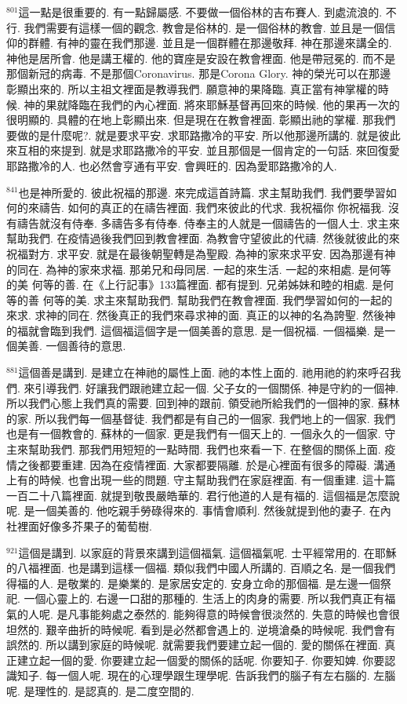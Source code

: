\documentclass{book}
\begin{document}
$^{801}$這一點是很重要的.
有一點歸屬感.
不要做一個俗林的吉布賽人.
到處流浪的.
不行.
我們需要有這樣一個的觀念.
教會是俗林的.
是一個俗林的教會.
並且是一個信仰的群體.
有神的靈在我們那邊.
並且是一個群體在那邊敬拜.
神在那邊來講全的.
神他是居所會.
他是講王權的.
他的寶座是安設在教會裡面.
他是帶冠冕的.
而不是那個新冠的病毒.
不是那個Coronavirus.
那是Corona Glory.
神的榮光可以在那邊彰顯出來的.
所以主祖文裡面是教導我們.
願意神的果降臨.
真正當有神掌權的時候.
神的果就降臨在我們的內心裡面.
將來耶穌基督再回來的時候.
他的果再一次的很明顯的.
具體的在地上彰顯出來.
但是現在在教會裡面.
彰顯出祂的掌權.
那我們要做的是什麼呢?.
就是要求平安.
求耶路撒冷的平安.
所以他那邊所講的.
就是彼此來互相的來提到.
就是求耶路撒冷的平安.
並且那個是一個肯定的一句話.
來回復愛耶路撒冷的人.
也必然會亨通有平安.
會興旺的.
因為愛耶路撒冷的人.

$^{841}$也是神所愛的.
彼此祝福的那邊.
來完成這首詩篇.
求主幫助我們.
我們要學習如何的來禱告.
如何的真正的在禱告裡面.
我們來彼此的代求.
我祝福你 你祝福我.
沒有禱告就沒有侍奉.
多禱告多有侍奉.
侍奉主的人就是一個禱告的一個人士.
求主來幫助我們.
在疫情過後我們回到教會裡面.
為教會守望彼此的代禱.
然後就彼此的來祝福對方.
求平安.
就是在最後朝聖轉是為聖殿.
為神的家來求平安.
因為那邊有神的同在.
為神的家來求福.
那弟兄和母同居.
一起的來生活.
一起的來相處.
是何等的美 何等的善.
在《上行記事》133篇裡面.
都有提到.
兄弟姊妹和睦的相處.
是何等的善 何等的美.
求主來幫助我們.
幫助我們在教會裡面.
我們學習如何的一起的來求.
求神的同在.
然後真正的我們來尋求神的面.
真正的以神的名為誇聖.
然後神的福就會臨到我們.
這個福這個字是一個美善的意思.
是一個祝福.
一個福樂.
是一個美善.
一個善待的意思.

$^{881}$這個善是講到.
是建立在神祂的屬性上面.
祂的本性上面的.
祂用祂的約來呼召我們.
來引導我們.
好讓我們跟祂建立起一個.
父子女的一個關係.
神是守約的一個神.
所以我們心態上我們真的需要.
回到神的跟前.
領受祂所給我們的一個神的家.
蘇林的家.
所以我們每一個基督徒.
我們都是有自己的一個家.
我們地上的一個家.
我們也是有一個教會的.
蘇林的一個家.
更是我們有一個天上的.
一個永久的一個家.
守主來幫助我們.
那我們用短短的一點時間.
我們也來看一下.
在整個的關係上面.
疫情之後都要重建.
因為在疫情裡面.
大家都要隔離.
於是心裡面有很多的障礙.
溝通上有的時候.
也會出現一些的問題.
守主幫助我們在家庭裡面.
有一個重建.
這十篇一百二十八篇裡面.
就提到敬畏嚴皓華的.
君行他道的人是有福的.
這個福是怎麼說呢.
是一個美善的.
他吃親手勞碌得來的.
事情會順利.
然後就提到他的妻子.
在內社裡面好像多芥果子的葡萄樹.

$^{921}$這個是講到.
以家庭的背景來講到這個福氣.
這個福氣呢.
士平經常用的.
在耶穌的八福裡面.
也是講到這樣一個福.
類似我們中國人所講的.
百順之名.
是一個我們得福的人.
是敬業的.
是樂業的.
是家居安定的.
安身立命的那個福.
是左邊一個祭祀.
一個心靈上的.
右邊一口甜的那種的.
生活上的肉身的需要.
所以我們真正有福氣的人呢.
是凡事能夠處之泰然的.
能夠得意的時候會很淡然的.
失意的時候也會很坦然的.
艱辛曲折的時候呢.
看到是必然都會遇上的.
逆境滄桑的時候呢.
我們會有誤然的.
所以講到家庭的時候呢.
就需要我們要建立起一個的.
愛的關係在裡面.
真正建立起一個的愛.
你要建立起一個愛的關係的話呢.
你要知子.
你要知婢.
你要認識知子.
每一個人呢.
現在的心理學跟生理學呢.
告訴我們的腦子有左右腦的.
左腦呢.
是理性的.
是認真的.
是二度空間的.
\end{document}
